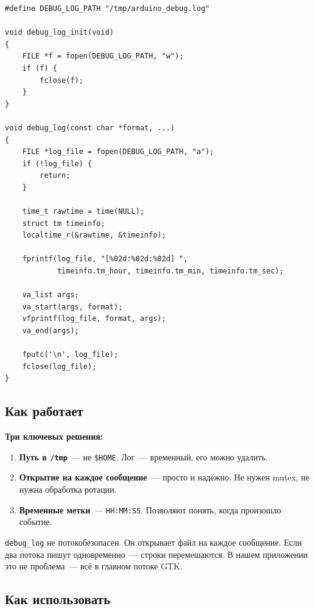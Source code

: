 \begin{listing}[htbp]
\begin{verbatim}
#define DEBUG_LOG_PATH "/tmp/arduino_debug.log"

void debug_log_init(void)
{
    FILE *f = fopen(DEBUG_LOG_PATH, "w");
    if (f) {
        fclose(f);
    }
}

void debug_log(const char *format, ...)
{
    FILE *log_file = fopen(DEBUG_LOG_PATH, "a");
    if (!log_file) {
        return;
    }

    time_t rawtime = time(NULL);
    struct tm timeinfo;
    localtime_r(&rawtime, &timeinfo);

    fprintf(log_file, "[%02d:%02d:%02d] ",
            timeinfo.tm_hour, timeinfo.tm_min, timeinfo.tm_sec);

    va_list args;
    va_start(args, format);
    vfprintf(log_file, format, args);
    va_end(args);

    fputc('\n', log_file);
    fclose(log_file);
}
\end{verbatim}
\caption{\texttt{debug\_log.c}~--- отладочный лог}
\label{lst:debug-log}
\end{listing}

\subsection{Как работает}

\textbf{Три ключевых решения:}

\begin{enumerate}
    \item \textbf{Путь в \texttt{/tmp}}~--- не \texttt{\$HOME}.
          Лог~--- временный, его можно удалить.
    \item \textbf{Открытие на каждое сообщение}~---
          просто и надёжно. Не нужен mutex,
          не нужна обработка ротации.
    \item \textbf{Временные метки}~--- \texttt{HH:MM:SS}.
          Позволяют понять, когда произошло событие.
\end{enumerate}

\begin{warnbox}
\texttt{debug\_log} не потокобезопасен. Он открывает
файл на каждое сообщение. Если два потока
пишут одновременно~--- строки перемешаются.
В нашем приложении это не проблема~---
всё в главном потоке GTK.
\end{warnbox}

\subsection{Как использовать}

